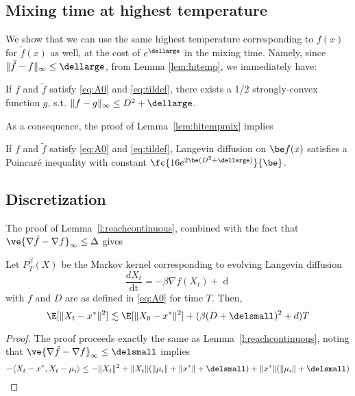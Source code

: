 \subsection{Mixing time at highest temperature} 

We show that we can use the same highest temperature corresponding to $f(x)$ for $\tilde{f}(x)$ as well, at the cost of $e^{\dellarge}$ in the mixing time. Namely, since $\|\tilde{f} - f\|_{\infty} \leq \dellarge$, from Lemma \ref{lem:hitemp}, we immediately have: 
\begin{lem} 
If $f$ and $\tilde{f}$ satisfy \eqref{eq:A0} and \eqref{eq:tildef}, there exists a 1/2 strongly-convex function $g$, s.t. $\|f-g\|_{\infty} \leq D^2 + \dellarge$. 
\end{lem} 

As a consequence, the proof of Lemma~\ref{lem:hitempmix} implies 
\begin{lem}  
If $f$ and $\tilde{f}$ satisfy \eqref{eq:A0} and \eqref{eq:tildef}, Langevin diffusion on $\be f(x)$ satisfies a Poincar\'e inequality with constant $\fc{ 16e^{2\be (D^2 + \dellarge)}}{\be}$.
\label{l:hitempmix-perturb}
\end{lem} 


\subsection{Discretization} 

The proof of Lemma~\ref{l:reachcontinuous}, combined with the fact that $\ve{\nabla \tilde{f} - \nabla f}_{\infty} \leq \Delta$ gives

\begin{lem} Let $P^{\beta}_T(X)$ be the Markov kernel corresponding to evolving Langevin diffusion 
\begin{equation*}\frac{dX_t}{\mathop{dt}} = - \beta \nabla f(X_t) + \mathop{d B_t}\end{equation*} 
with $f$ and $D$ are as defined in \ref{eq:A0} for time $T$. Then, 
\begin{equation*}\E[\|X_t - x^*\|^2] \lesssim \E[\|X_0 - x^*\|^2] + (\beta (D+ \delsmall)^2  + d)T \end{equation*} 
\end{lem} 
\begin{proof} 
The proof proceeds exactly the same as Lemma~\ref{l:reachcontinuous}, noting that $\ve{\nabla \tilde{f} - \nabla f}_{\infty} \leq \delsmall$  implies
$$ - \langle X_t - x^*, X_t - \mu_i \rangle \leq -\|X_t\|^2 + \|X_t\| (\|\mu_i\| + \|x^*\| + \delsmall) + \|x^*\| (\|\mu_i\| + \delsmall) $$  
\end{proof} 

